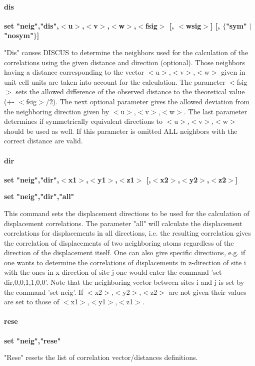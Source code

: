 \paragraph*{dis}
{\bf set "neig","dis",$ <$u$> $,$ <$v$> $,$ <$w$> $,$ <$fsig$> $ [, $ <$wsig$> $] [, $ \{$"sym" $| $ "nosym"$\} $] \par }
\par
\vspace{3pt}
"Dis" causes DISCUS to determine the neighbors used for the 
calculation of the correlations using the given distance and 
direction (optional). Those neighbors having a distance corresponding 
to the vector $ <$u$> $,$ <$v$> $,$ <$w$> $ given in unit cell units are taken into 
account for the calculation. The parameter $ <$fsig$> $ sets the allowed 
difference of the observed distance to the theoretical value 
(+- $ <$fsig$> $/2). The next optional parameter gives the allowed deviation 
from the neighboring direction given by $ <$u$> $,$ <$v$> $,$ <$w$> $. The last 
parameter determines if symmetrically equivalent directions to 
$ <$u$> $,$ <$v$> $,$ <$w$> $ should be used as well. If this parameter is omitted ALL 
neighbors with the correct distance are valid. 
\paragraph*{dir}
{\bf set "neig","dir",$ <$x1$> $,$ <$y1$> $,$ <$z1$> $ [,$ <$x2$> $,$ <$y2$> $,$ <$z2$> $] \par }
{\bf set "neig","dir","all" \par }
\par
\vspace{3pt}
This command sets the displacement directions to be used for the 
calculation of displacement correlations. The parameter "all" will 
calculate the displacement correlations for displacements in all 
directions, i.e. the resulting correlation gives the correlation 
of displacements of two neighboring atoms regardless of the direction 
of the displacement itself. One can also give specific directions, 
e.g. if one wants to determine the correlations of displacements 
in  z-direction of site i with the ones in x direction of site j 
one would enter the command 'set dir,0,0,1,1,0,0'. Note that the 
neighboring vector between sites i and j is set by the command 
'set neig'. If $ <$x2$> $,$ <$y2$> $,$ <$z2$> $ are not given their values are set to 
those of $ <$x1$> $,$ <$y1$> $,$ <$z1$> $. 
\paragraph*{rese}
{\bf set "neig","rese" \par }
\par
\vspace{3pt}
"Rese" resets the list of correlation vector/distances definitions. 
